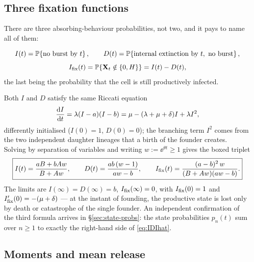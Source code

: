 \subsection{Three fixation functions}
\label{sec:fixation-funcs}

There are three absorbing-behaviour probabilities, not two, and it pays to
name all of them:
\begin{definition}
\begin{equation}
I(t)=\mathbb{P}\!\left\{\text{no burst by }t\right\},\qquad
D(t)=\mathbb{P}\!\left\{\text{internal extinction by }t,\ \text{no burst}\right\},
\end{equation}
\begin{equation}
I_{\mathrm{fix}}(t)=\mathbb{P}\!\left\{{{\bf X}_t}\notin\{0,H\}\right\}=I(t)-D(t),
\end{equation}
the last being the probability that the cell is still productively infected.
\end{definition}

Both $I$ and $D$ satisfy the same Riccati equation
\begin{equation}
\displaystyle\frac{{\rm d} I}{{\rm d} t}=\lambda(I-a)(I-b)=\mu-(\lambda+\mu+\delta)I+\lambda I^2,
\label{eq:riccati}
\end{equation}
differently initialised ($I(0)=1$, $D(0)=0$); the branching term $I^2$ comes
from the two independent daughter lineages that a birth of the founder
creates. Solving by separation of variables and writing
$w:=\ee^{\theta t}\ge1$ gives the boxed triplet
\begin{equation}
\boxed{I(t)=\frac{aB+bAw}{B+Aw},\qquad
D(t)=\frac{ab\,(w-1)}{aw-b},\qquad
I_{\mathrm{fix}}(t)=\frac{(a-b)^2\,w}{(B+Aw)(aw-b)}.}
\label{eq:IDIhat}
\end{equation}
The limits are $I(\infty)=D(\infty)=b$, $I_{\mathrm{fix}}(\infty)=0$, with
$I_{\mathrm{fix}}(0)=1$ and $I_{\mathrm{fix}}'(0)=-(\mu+\delta)$ --- at the instant of founding,
the productive state is lost only by death or catastrophe of the single
founder. An independent confirmation of the third formula arrives in
\S\ref{sec:state-probs}: the state probabilities $p_n(t)$ sum over $n\ge1$
to exactly the right-hand side of \eqref{eq:IDIhat}.

\subsection{Moments and mean release}
\label{sec:moments-recap}

